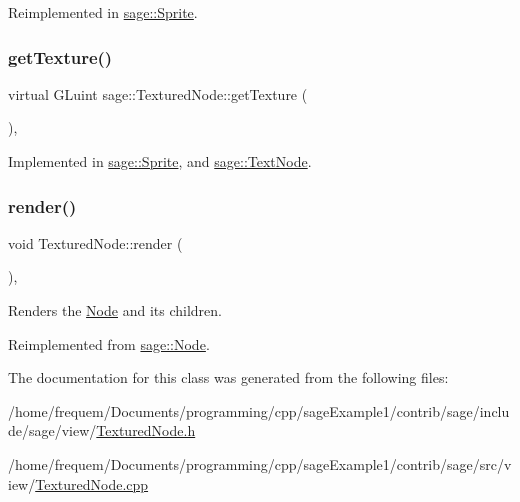 Reimplemented in \mbox{\hyperlink{classsage_1_1Sprite_a3e5acc98484d2f326fdd1ff622cfd2ff}{sage\+::\+Sprite}}.

\mbox{\label{classsage_1_1TexturedNode_a079cea0b12a1d0e3ea69459546736c0f}} 
\subsubsection{\texorpdfstring{getTexture()}{getTexture()}}
{\footnotesize\ttfamily virtual G\+Luint sage\+::\+Textured\+Node\+::get\+Texture (\begin{DoxyParamCaption}{ }\end{DoxyParamCaption})\hspace{0.3cm}{\ttfamily [protected]}, {}}



Implemented in \mbox{\hyperlink{classsage_1_1Sprite_aa75f3595b809f99847a9642ce2bf319a}{sage\+::\+Sprite}}, and \mbox{\hyperlink{classsage_1_1TextNode_ae21f17c6cb993692d8da89424b2581d7}{sage\+::\+Text\+Node}}.

\mbox{\label{classsage_1_1TexturedNode_a17465d5cb984880866f90145bb93d928}} 
\subsubsection{\texorpdfstring{render()}{render()}}
{\footnotesize\ttfamily void Textured\+Node\+::render (\begin{DoxyParamCaption}{ }\end{DoxyParamCaption})\hspace{0.3cm}{\ttfamily [override]}, {\ttfamily [virtual]}}



Renders the \mbox{\hyperlink{classsage_1_1Node}{Node}} and its children. 



Reimplemented from \mbox{\hyperlink{classsage_1_1Node_ab93a6f41e02422a21c44227c0355382a}{sage\+::\+Node}}.



The documentation for this class was generated from the following files\+:\begin{DoxyCompactItemize}
\item 
/home/frequem/\+Documents/programming/cpp/sage\+Example1/contrib/sage/include/sage/view/\mbox{\hyperlink{TexturedNode_8h}{Textured\+Node.\+h}}\item 
/home/frequem/\+Documents/programming/cpp/sage\+Example1/contrib/sage/src/view/\mbox{\hyperlink{TexturedNode_8cpp}{Textured\+Node.\+cpp}}\end{DoxyCompactItemize}
